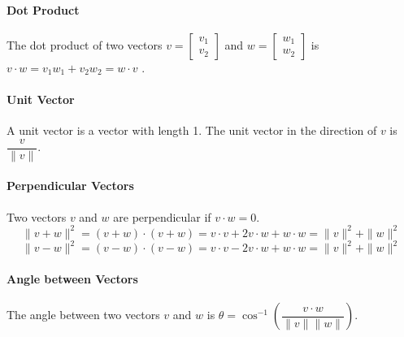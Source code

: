 \paragraph{Dot Product} The dot product of two vectors $v=\begin{bmatrix}
		v_{1} \\
		v_{2}
	\end{bmatrix}$ and $w=\begin{bmatrix}
		w_{1} \\
		w_{2}
	\end{bmatrix}$ is $v \cdot w = v_{1}w_{1} + v_{2}w_{2} = w \cdot v$ .

\paragraph{Unit Vector} A unit vector is a vector with length 1. The unit vector in the direction of $v$ is $\dfrac{v}{\|v\|}$.

\paragraph{Perpendicular Vectors} Two vectors $v$ and $w$ are perpendicular if $v \cdot w = 0$.
\[
	\|v + w\|^2 = (v + w) \cdot (v + w) = v \cdot v + 2v \cdot w + w \cdot w = \|v\|^2 + \|w\|^2
\]
\[
	\|v - w\|^2 = (v - w) \cdot (v - w) = v \cdot v - 2v \cdot w + w \cdot w = \|v\|^2 + \|w\|^2
\]

\paragraph{Angle between Vectors} The angle between two vectors $v$ and $w$ is $\theta = \cos^{-1} \left( \dfrac{v \cdot w}{\|v\| \|w\|} \right)$.

